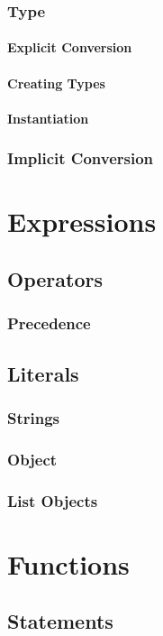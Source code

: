 \documentclass[12pt,letterpaper]{report}
\begin{document}





\subsection{Type}            
\subsubsection{Explicit Conversion}
\subsubsection{Creating Types}
\subsubsection{Instantiation}
\subsection{Implicit Conversion}
\chapter{Expressions}
\section{Operators}
\subsection{Precedence}
\section{Literals}
\subsection{Strings}
\subsection{Object}
\subsection{List Objects}
\chapter{Functions}
\section{Statements}
\end{document}
